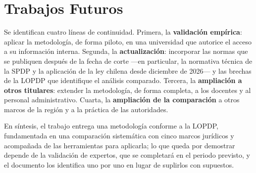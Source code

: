 \section{Trabajos Futuros}

Se identifican cuatro líneas de continuidad. Primera, la \textbf{validación empírica}: aplicar la metodología, de forma piloto, en una universidad que autorice el acceso a su información interna. Segunda, la \textbf{actualización}: incorporar las normas que se publiquen después de la fecha de corte ---en particular, la normativa técnica de la SPDP y la aplicación de la ley chilena desde diciembre de 2026--- y las brechas de la LOPDP que identifique el análisis comparado. Tercera, la \textbf{ampliación a otros titulares}: extender la metodología, de forma completa, a los docentes y al personal administrativo. Cuarta, la \textbf{ampliación de la comparación} a otros marcos de la región y a la práctica de las autoridades.

En síntesis, el trabajo entrega una metodología conforme a la LOPDP, fundamentada en una comparación sistemática con cinco marcos jurídicos y acompañada de las herramientas para aplicarla; lo que queda por demostrar depende de la validación de expertos, que se completará en el periodo previsto, y el documento los identifica uno por uno en lugar de suplirlos con supuestos.
